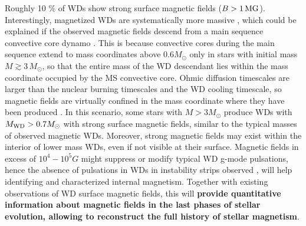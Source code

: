 
Roughly 10 \% of WDs show strong surface magnetic fields ($B > 1 \, {\rm MG}$).
Interestingly, magnetized WDs are systematically more massive \cite{Ferrario_2015}, which could be explained if the observed magnetic fields descend from a main sequence convective core dynamo \cite{Cantiello_2016}. This is because convective cores during the main sequence extend to mass coordinates above 0.6$M_\odot$ only in stars with initial mass $M \gtrsim 3 \, M_\odot$, so that the entire mass of the WD descendant lies within the mass coordinate occupied by the MS convective core. Ohmic diffusion timescales are larger than the nuclear burning timescales and the WD cooling timescale, so magnetic fields are virtually confined in the mass coordinate where they have been produced \cite{Cantiello_2016}. In this scenario, some stars with $M>3M_\odot$ produce WDs with $M_{\rm WD}>0.7M_\odot$ with strong surface magnetic fields, similar to the typical masses of observed magnetic WDs. Moreover, strong magnetic fields may exist within the interior of lower mass WDs, even if not visible at their surface. Magnetic fields in excess of $10^4-10^5 G$ might suppress or modify typical WD g-mode pulsations, hence the absence of pulsations in WDs in instability strips observed , will help identifying and characterized internal magnetism. Together with existing observations of WD surface magnetic fields, this will \textbf{provide quantitative information about magnetic fields in the last phases of stellar evolution, allowing to reconstruct the full history of stellar magnetism}.